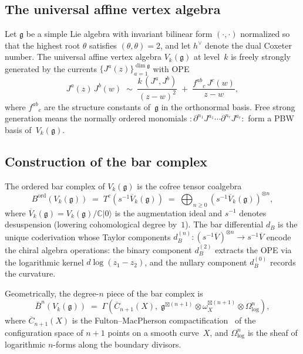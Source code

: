 \documentclass[11pt]{article}
\theoremstyle{plain}
\theoremstyle{definition}
\theoremstyle{remark}
\newcommand{\fg}{\mathfrak{g}}
\newcommand{\barB}{\bar{B}}
\numberwithin{equation}{section}
\begin{document}
\subsection{The universal affine vertex algebra}

Let $\fg$ be a simple Lie algebra with invariant bilinear form
$(\cdot, \cdot)$ normalized so that the highest root
$\theta$ satisfies $(\theta, \theta) = 2$, and let
$h^\vee$ denote the dual Coxeter number. The universal
affine vertex algebra $V_k(\fg)$ at level~$k$ is freely
strongly generated by the currents $\{J^a(z)\}_{a=1}^{\dim\fg}$
with OPE
\begin{equation}\label{eq:km-ope}
J^a(z)\, J^b(w) \;\sim\;
\frac{k\,(J^a, J^b)}{(z-w)^2}
\;+\; \frac{f^{ab}{}_{c}\, J^c(w)}{z-w},
\end{equation}
where $f^{ab}{}_c$ are the structure constants of~$\fg$
in the orthonormal basis. Free strong generation means the
normally ordered monomials
$:\!\partial^{n_1} J^{a_1} \cdots \partial^{n_r} J^{a_r}\!:$
form a PBW basis of~$V_k(\fg)$.

\subsection{Construction of the bar complex}

The ordered bar complex of $V_k(\fg)$ is the cofree tensor
coalgebra
\begin{equation}\label{eq:bar-def}
B^{\mathrm{ord}}(V_k(\fg))
\;=\; T^c(s^{-1}\overline{V}_k(\fg))
\;=\; \bigoplus_{n \geq 0}
(s^{-1}\overline{V}_k(\fg))^{\otimes n},
\end{equation}
where $\overline{V}_k(\fg) = V_k(\fg)/\mathbb{C}|0\rangle$
is the augmentation ideal and $s^{-1}$ denotes desuspension
(lowering cohomological degree by~$1$).
The bar differential $d_B$ is the unique coderivation
whose Taylor components $d_B^{(n)}\colon
(s^{-1}\overline{V})^{\otimes n} \to s^{-1}\overline{V}$
encode the chiral algebra operations:
the binary component $d_B^{(2)}$ extracts the OPE
via the logarithmic kernel $d\log(z_1 - z_2)$,
and the nullary component $d_B^{(0)}$ records the
curvature.

Geometrically, the degree-$n$ piece of the bar complex is
\begin{equation}\label{eq:bar-geometric}
\barB^n(V_k(\fg))
\;=\; \Gamma\!\left(\overline{C}_{n+1}(X),\;
\fg^{\boxtimes(n+1)} \otimes \omega_X^{\boxtimes(n+1)}
\otimes \Omega^n_{\log}\right),
\end{equation}
where $\overline{C}_{n+1}(X)$ is the Fulton--MacPherson
compactification~\cite{FultonMacPherson94} of the configuration space
of $n{+}1$ points on a smooth curve~$X$, and
$\Omega^n_{\log}$ is the sheaf of logarithmic $n$-forms
along the boundary divisors.
\end{document}

